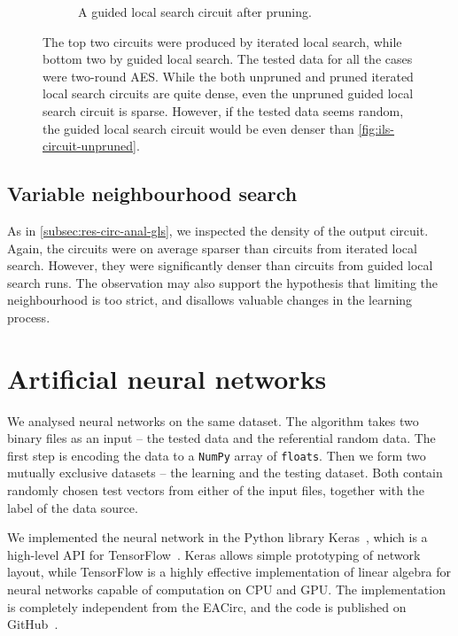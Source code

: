 \documentclass[
  print, %
  Table,   %
  nolof,     %
  nolot,     %
  11pt, %
  oneside  %
]{fithesis3}
\begin{document}
\begin{figure}
\begin{changemargin}{-3cm}{-3cm}
\begin{subfigure}{.65\textwidth}
  \caption{A guided local search circuit after pruning.}
  \label{fig:gls-circuit-pruned}
\end{subfigure}
\end{changemargin}
\caption{The top two circuits were produced by iterated local search, while bottom two by guided local search. The tested data for all the cases were two-round AES. While the both unpruned and pruned iterated local search circuits are quite dense, even the unpruned guided local search circuit is sparse. However, if the tested data seems random, the guided local search circuit would be even denser than \cref{fig:ils-circuit-unpruned}.}
\label{fig:ils-gls-circuits}
\end{figure}

\subsection{Variable neighbourhood search}
\label{subsec:res-circ-anal-vns}

As in \cref{subsec:res-circ-anal-gls}, we inspected the density of the output circuit. Again, the circuits were on average sparser than circuits from iterated local search. However, they were significantly denser than circuits from guided local search runs. The observation may also support the hypothesis that limiting the neighbourhood is too strict, and disallows valuable changes in the learning process.



\section{Artificial neural networks}
\label{sec:res-ann}

We analysed neural networks on the same dataset. The algorithm takes two binary files as an input -- the tested data and the referential random data. The first step is encoding the data to a \texttt{NumPy} array of \texttt{floats}. Then we form two mutually exclusive datasets -- the learning and the testing dataset. Both contain randomly chosen test vectors from either of the input files, together with the label of the data source.

We implemented the neural network in the Python library Keras~\cite{chollet2015keras}, which is a high-level API for TensorFlow~\cite{abadi2016tensorflow}. Keras allows simple prototyping of network layout, while TensorFlow is a highly effective implementation of linear algebra for neural networks capable of computation on CPU and GPU. The implementation is completely independent from the EACirc, and the code is published on GitHub~\cite{EANet}.
\end{document}
